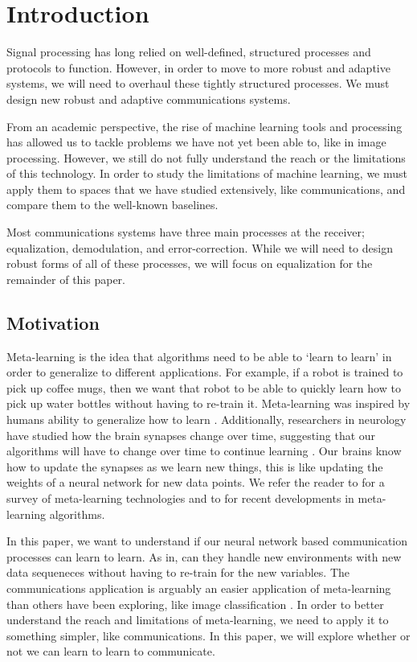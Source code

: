 \chapter{Introduction}

Signal processing has long relied on well-defined, structured processes and protocols to function.  However, in order to move to more robust and adaptive systems, we will need to overhaul these tightly structured processes.  We must design new robust and adaptive communications systems.

From an academic perspective, the rise of machine learning tools and processing has allowed us to tackle problems we have not yet been able to, like in image processing.  However, we still do not fully understand the reach or the limitations of this technology.  In order to study the limitations of machine learning, we must apply them to spaces that we have studied extensively, like communications, and compare them to the well-known baselines.

Most communications systems have three main processes at the receiver; equalization, demodulation, and error-correction.  While we will need to design robust forms of all of these processes, we will focus on equalization for the remainder of this paper. 

\section{Motivation}

Meta-learning is the idea that algorithms need to be able to `learn to learn' in order to generalize to different applications.  For example, if a robot is trained to pick up coffee mugs, then we want that robot to be able to quickly learn how to pick up water bottles without having to re-train it.  
Meta-learning was inspired by humans ability to generalize how to learn \cite{lake}.  
Additionally, researchers in neurology have studied how the brain synapses change over time, suggesting that our algorithms will have to change over time to continue learning \cite{bengio}.
Our brains know how to update the synapses as we learn new things, this is like updating the weights of a neural network for new data points.  
We refer the reader to \cite{lemke} for a survey of meta-learning technologies and to \cite{finn} for recent developments in meta-learning algorithms.

In this paper, we want to understand if our neural network based communication processes can learn to learn.  
As in, can they handle new environments with new data sequeneces without having to re-train for the new variables. 
The communications application is arguably an easier application of meta-learning than others have been exploring, like image classification \cite{khodadadeh}.  
In order to better understand the reach and limitations of meta-learning, we need to apply it to something simpler, like communications.  In this paper, we will explore whether or not we can learn to learn to communicate. 


